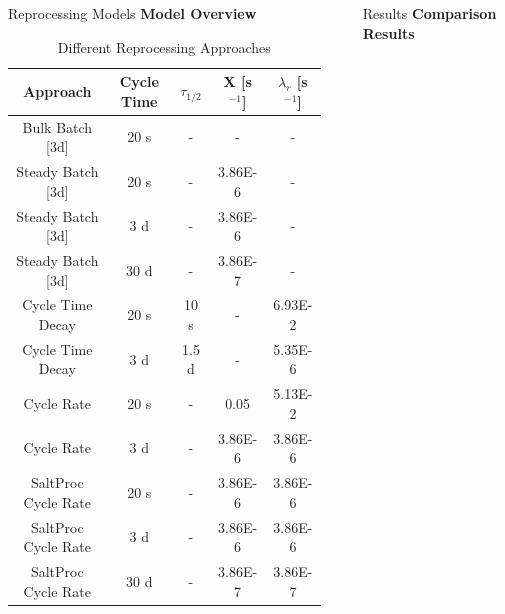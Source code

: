 \documentclass[final]{beamer}
\newlength{\sepwid}
\newlength{\onecolwid}
\newlength{\threecolwid}
\begin{document}
\begin{frame}[t]
\begin{columns}[t,totalwidth=\threecolwid]
\begin{column}{\onecolwid}
\begin{block}{Reprocessing Models}
\vspace{0.7em}
\textbf{Model Overview}

\begin{table}[H]
\renewcommand{\arraystretch}{1.25}
\caption{Different Reprocessing Approaches}
\label{tab:keff_vals}
\begin{center}
\begin{tabular}{ | c | c | c | c | c | }
 \hline
	Approach & Cycle Time & $\tau_{1/2}$ & X [s$^{-1}$] & $\lambda_{r}$ [s$^{-1}$]\\
 \hline
 \hline
 Bulk Batch [3d] & 20 s & - & - & -\\
 Steady Batch [3d] & 20 s & - & 3.86E-6 & -\\
 Steady Batch [3d] & 3 d & - & 3.86E-6 & -\\
 Steady Batch [3d] & 30 d & - & 3.86E-7 & -\\
 \hline
 Cycle Time Decay & 20 s & 10 s & - & 6.93E-2\\
 Cycle Time Decay & 3 d & 1.5 d & - & 5.35E-6\\
 Cycle Rate & 20 s & - & 0.05 & 5.13E-2\\
 Cycle Rate & 3 d & - & 3.86E-6 & 3.86E-6\\
 SaltProc Cycle Rate & 20 s & - & 3.86E-6 & 3.86E-6\\
 SaltProc Cycle Rate & 3 d & - & 3.86E-6 & 3.86E-6\\
 SaltProc Cycle Rate & 30 d & - & 3.86E-7 & 3.86E-7\\
 
 \hline
\end{tabular}
\end{center}
\end{table}


\end{block}


\end{column} %

\begin{column}{\sepwid}\end{column} %

\begin{column}{\onecolwid} %

\begin{block}{Results}
%
%
\vspace{0.7em}
\textbf{Comparison Results}


\end{block}
\end{column}
\end{columns}
\end{frame}
\end{document}
